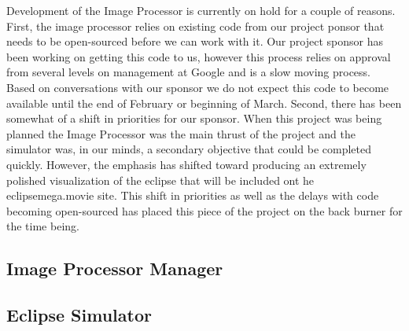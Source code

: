 \documentclass[10pt, onecolumn, draftclsnofoot, letterpaper, compsoc]{IEEEtran}
\begin{document}
Development of the Image Processor is currently on hold for a couple of reasons.
First, the image processor relies on existing code from our project ponsor that
needs to be open-sourced before we can work with it. Our project sponsor has
been working on getting this code to us, however this process relies on approval
from several levels on management at Google and is a slow moving process. Based
on conversations with our sponsor we do not expect this code to become available
until the end of February or beginning of March. Second, there has been somewhat
of a shift in priorities for our sponsor. When this project was being planned
the Image Processor was the main thrust of the project and the simulator was, in
our minds, a secondary objective that could be completed quickly. However, the
emphasis has shifted toward producing an extremely polished visualization of the
eclipse that will be included ont he eclipsemega.movie site. This shift in
priorities as well as the delays with code becoming open-sourced has placed this
piece of the project on the back burner for the time being.

\subsection{Image Processor Manager}


\subsection{Eclipse Simulator}

\end{document}
